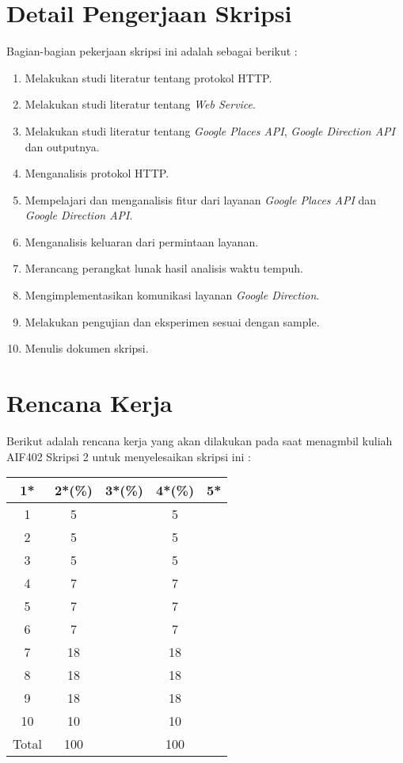 \documentclass[a4paper,twoside]{article}
\begin{document}
\section{Detail Pengerjaan Skripsi}

Bagian-bagian pekerjaan skripsi ini adalah sebagai berikut :
	\begin{enumerate}
		\item Melakukan studi literatur tentang protokol HTTP.
		\item Melakukan studi literatur tentang \textit{Web Service}.
		\item Melakukan studi literatur tentang \textit{Google Places API}, \textit{Google Direction API} dan outputnya.
		\item Menganalisis protokol HTTP.
		\item Mempelajari dan menganalisis fitur dari layanan \textit{Google Places API} dan \textit{Google Direction API}.
		\item Menganalisis keluaran dari permintaan layanan.
		\item Merancang perangkat lunak hasil analisis waktu tempuh.
		\item Mengimplementasikan komunikasi layanan \textit{Google Direction}.
		\item Melakukan pengujian dan eksperimen sesuai dengan sample.
		\item Menulis dokumen skripsi.
	\end{enumerate}

\section{Rencana Kerja}

Berikut adalah rencana kerja yang akan dilakukan pada saat menagmbil kuliah AIF402 Skripsi 2 untuk menyelesaikan skripsi ini :

\begin{center}
  \begin{tabular}{ | c | c | c | c | l |}
    \hline
    1*  & 2*(\%) & 3*(\%) & 4*(\%) &5*\\ \hline \hline
    1   & 5  &    & 5  & \\ \hline
    2   & 5  &    & 5  & \\ \hline
    3   & 5  &    & 5  & \\ \hline
    4   & 7  &    & 7  & \\ \hline
    5   & 7  &    & 7  & \\ \hline
    6   & 7  &    & 7  & \\ \hline
    7   & 18 &    & 18 & \\ \hline
    8   & 18 &    & 18 & \\ \hline
    9   & 18 &    & 18 & \\ \hline
    10  & 10 &    & 10 & \\ \hline
    Total  & 100  &    & 100 &  \\ \hline
                          \end{tabular}
\end{center}
\end{document}
